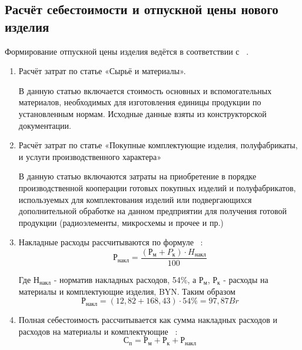 \subsection{Расчёт себестоимости и отпускной цены нового изделия}

Формирование отпускной цены изделия ведётся в соответствии с
~\cite{bsuir-project-economics}.

\begin{enumerate}
\item Расчёт затрат по статье «Сырьё и материалы».

  В данную статью включается стоимость основных и вспомогательных
  материалов, необходимых для изготовления единицы продукции по
  установленным нормам. Исходные данные взяты из конструкторской
  документации.
  
  

\item Расчёт затрат по статье «Покупные комплектующие изделия,
  полуфабрикаты, и услуги производственного характера»

  В данную статью включаются затраты на приобретение в порядке
  производственной кооперации готовых покупных изделий и полуфабрикатов,
  используемых для комплектования изделий или подвергающихся
  дополнительной обработке на данном предприятии для получения готовой
  продукции (радиоэлементы, микросхемы и прочее и пр.)

  



  
\item Накладные расходы рассчитываются по формуле ~\cite{bsuir-project-economics}:
\begin{equation}
  Р_{накл}=\frac{(Р_м+P_к) \cdot H_{накл}}{100}
\end{equation}

Где  $Н_{накл}$ - норматив накладных расходов, 54\%, а $Р_м$, $Р_к$ - расходы на материалы и комплектующие изделия, BYN.
Таким образом
$$  Р_{накл}=(12,82+168,43) \cdot 54\%  = 97,87 Br$$

\item Полная себестоимость рассчитывается как сумма накладных расходов и
расходов на материалы и комплектующие ~\cite{bsuir-project-economics}:
\begin{equation}
  С_п =Р_м + Р_к + Р_{накл}
\end{equation} 


\end{enumerate}
